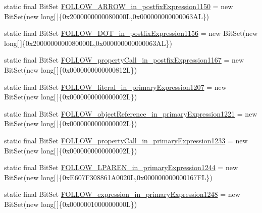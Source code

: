 \begin{DoxyCompactItemize}
\item 
static final Bit\-Set \hyperlink{classorg_1_1tzi_1_1use_1_1parser_1_1ocl_1_1_o_c_l_parser_aeac2f8abce2f93036dbfd43551bc9386}{F\-O\-L\-L\-O\-W\-\_\-\-A\-R\-R\-O\-W\-\_\-in\-\_\-postfix\-Expression1150} = new Bit\-Set(new long\mbox{[}$\,$\mbox{]}\{0x2000000000080000\-L,0x000000000000063\-A\-L\})
\item 
static final Bit\-Set \hyperlink{classorg_1_1tzi_1_1use_1_1parser_1_1ocl_1_1_o_c_l_parser_af40da774ee2fa151de80022bdfd8c7b8}{F\-O\-L\-L\-O\-W\-\_\-\-D\-O\-T\-\_\-in\-\_\-postfix\-Expression1156} = new Bit\-Set(new long\mbox{[}$\,$\mbox{]}\{0x2000000000080000\-L,0x000000000000063\-A\-L\})
\item 
static final Bit\-Set \hyperlink{classorg_1_1tzi_1_1use_1_1parser_1_1ocl_1_1_o_c_l_parser_a31678efb58f178fd90c8fbe84c22c4cc}{F\-O\-L\-L\-O\-W\-\_\-property\-Call\-\_\-in\-\_\-postfix\-Expression1167} = new Bit\-Set(new long\mbox{[}$\,$\mbox{]}\{0x0000000000000812\-L\})
\item 
static final Bit\-Set \hyperlink{classorg_1_1tzi_1_1use_1_1parser_1_1ocl_1_1_o_c_l_parser_afdbb05e32bece35cec9c1bf65c067089}{F\-O\-L\-L\-O\-W\-\_\-literal\-\_\-in\-\_\-primary\-Expression1207} = new Bit\-Set(new long\mbox{[}$\,$\mbox{]}\{0x0000000000000002\-L\})
\item 
static final Bit\-Set \hyperlink{classorg_1_1tzi_1_1use_1_1parser_1_1ocl_1_1_o_c_l_parser_a248b17e97177b1f43bc605d503e4a6fc}{F\-O\-L\-L\-O\-W\-\_\-object\-Reference\-\_\-in\-\_\-primary\-Expression1221} = new Bit\-Set(new long\mbox{[}$\,$\mbox{]}\{0x0000000000000002\-L\})
\item 
static final Bit\-Set \hyperlink{classorg_1_1tzi_1_1use_1_1parser_1_1ocl_1_1_o_c_l_parser_ab2dcd900a219a681e136c144b1ada6c6}{F\-O\-L\-L\-O\-W\-\_\-property\-Call\-\_\-in\-\_\-primary\-Expression1233} = new Bit\-Set(new long\mbox{[}$\,$\mbox{]}\{0x0000000000000002\-L\})
\item 
static final Bit\-Set \hyperlink{classorg_1_1tzi_1_1use_1_1parser_1_1ocl_1_1_o_c_l_parser_a4ce340f9695b480b5aef76689473d403}{F\-O\-L\-L\-O\-W\-\_\-\-L\-P\-A\-R\-E\-N\-\_\-in\-\_\-primary\-Expression1244} = new Bit\-Set(new long\mbox{[}$\,$\mbox{]}\{0x\-E607\-F308861\-A0020\-L,0x000000000000167\-F\-L\})
\item 
static final Bit\-Set \hyperlink{classorg_1_1tzi_1_1use_1_1parser_1_1ocl_1_1_o_c_l_parser_ac1119f297dcf66b937d107c64523cfe3}{F\-O\-L\-L\-O\-W\-\_\-expression\-\_\-in\-\_\-primary\-Expression1248} = new Bit\-Set(new long\mbox{[}$\,$\mbox{]}\{0x0000001000000000\-L\})

\end{DoxyCompactItemize}
